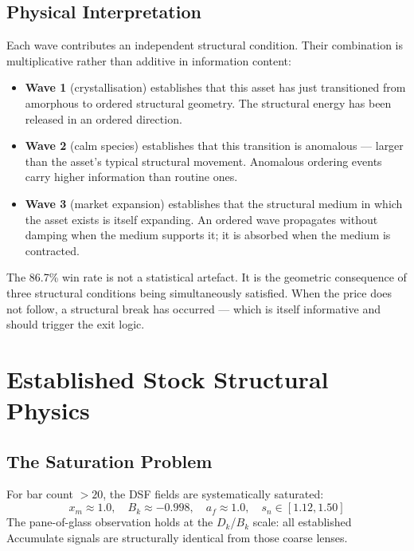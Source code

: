 \documentclass[11pt, a4paper]{article}
\newcommand{\sn}{s_n}
\newcommand{\Dk}{D_k}
\newcommand{\Bk}{B_k}
\theoremstyle{definition}
\begin{document}
\subsection{Physical Interpretation}

Each wave contributes an independent structural condition.
Their combination is multiplicative rather than additive in information content:

\begin{itemize}
  \item \textbf{Wave 1} (crystallisation) establishes that this asset has just
        transitioned from amorphous to ordered structural geometry.
        The structural energy has been released in an ordered direction.
  \item \textbf{Wave 2} (calm species) establishes that this transition is
        anomalous — larger than the asset's typical structural movement.
        Anomalous ordering events carry higher information than routine ones.
  \item \textbf{Wave 3} (market expansion) establishes that the structural
        medium in which the asset exists is itself expanding.
        An ordered wave propagates without damping when the medium supports
        it; it is absorbed when the medium is contracted.
\end{itemize}

The 86.7\% win rate is not a statistical artefact.
It is the geometric consequence of three structural conditions being
simultaneously satisfied.
When the price does not follow, a structural break has occurred —
which is itself informative and should trigger the exit logic.

\section{Established Stock Structural Physics}

\subsection{The Saturation Problem}

For bar count $> 20$, the DSF fields are systematically saturated:
\[
  x_m \approx 1.0, \quad \Bk \approx -0.998, \quad a_f \approx 1.0,
  \quad \sn \in [1.12, 1.50]
\]
The pane-of-glass observation holds at the $\Dk$/$\Bk$ scale:
all established Accumulate signals are structurally identical from those coarse lenses.
\end{document}
